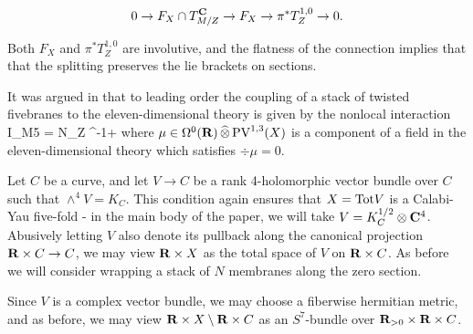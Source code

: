 \[
  0 \to F_{X}\cap T_{M/Z}^{\mathbf{C}}\to F_{X}\to \pi^{*}T^{1,0}_{Z}\to 0
.\]

Both $F_{X}$ and $\pi^{*}T^{1,0}_{Z}$ are involutive, and the flatness of the connection implies that that the splitting preserves the lie brackets on sections.

It was argued in \cite{RSW} that to leading order the coupling of a stack of twisted fivebranes to the eleven-dimensional theory is given by the nonlocal interaction
\beqn\label{eqn:br1}
I_{M5} = N\int_{Z} \div^{-1}\mu \vee \Omega +\cdots
\eeqn
where $\mu \in \Omega^0 (\mathbf{R}) \, \widehat{\otimes} \, {\rm PV}^{1,3}(X)$ is a component of a field in the eleven-dimensional theory which satisfies $\div \mu = 0$.

\parsec
Let $C$ be a curve, and let $V\to C$ be a rank 4-holomorphic vector bundle over $C$ such that $\wedge^{4} V = K_{C}$. This condition again ensures that $X = {\rm Tot} V$ is a Calabi-Yau five-fold - in the main body of the paper, we will take $V = K^{1/2}_{C}\otimes \mathbf{C}^{4}$. Abusively letting $V$ also denote its pullback along the canonical projection $\mathbf{R}\times C \to C$, we may view $\mathbf{R}\times X$ as the total space of $V$ on $\mathbf{R}\times C$. As before we will consider wrapping a stack of $N$ membranes along the zero section.

Since $V$ is a complex vector bundle, we may choose a fiberwise hermitian metric, and as before, we may view $\mathbf{R}\times X \setminus \mathbf{R}\times C$ as an $S^{7}$-bundle over $\mathbf{R}_{>0}\times \mathbf{R}\times C$.



